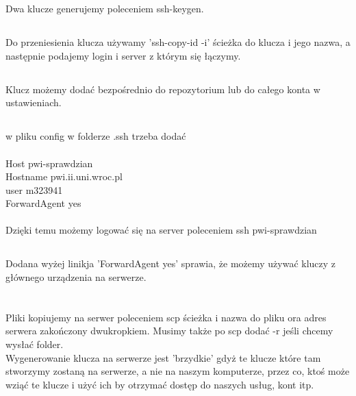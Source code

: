 \documentclass[a4paper]{article}
\begin{document}
\section{}
\subsection{}
Dwa klucze generujemy poleceniem ssh-keygen.
\subsection{}
Do przeniesienia klucza używamy 'ssh-copy-id -i' ścieżka do klucza i jego nazwa, a następnie podajemy login i server z którym się łączymy.
\subsection{}
Klucz możemy dodać bezpośrednio do repozytorium lub do całego konta w ustawieniach.
\subsection{}
w pliku config w folderze .ssh trzeba dodać\\ 
\\
Host pwi-sprawdzian\\
	Hostname pwi.ii.uni.wroc.pl\\
	user m323941\\
	ForwardAgent yes\\
	\\
Dzięki temu możemy logować się na server poleceniem
ssh pwi-sprawdzian
\subsection{}
Dodana wyżej linikja 'ForwardAgent yes' sprawia, że możemy używać kluczy z głównego urządzenia na serwerze.
\newpage
\section{}
\subsection{}
Pliki kopiujemy na serwer poleceniem scp ścieżka i nazwa do pliku ora adres serwera zakończony dwukropkiem. Musimy także po scp dodać -r jeśli chcemy wysłać folder.\\
Wygenerowanie klucza na serwerze jest 'brzydkie' gdyż te klucze które tam stworzymy zostaną na serwerze, a nie na naszym komputerze, przez co, ktoś może wziąć te klucze i użyć ich by otrzymać dostęp do naszych usług, kont itp.
\end{document}

